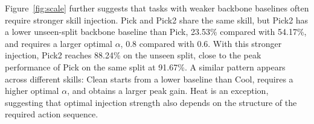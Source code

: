 \documentclass{llmxive}
\begin{document}
Figure~\ref{fig:scale} further suggests that tasks with weaker backbone baselines often require stronger skill injection. Pick and Pick2 share the same skill, but Pick2 has a lower unseen-split backbone baseline than Pick, 23.53\% compared with 54.17\%, and requires a larger optimal $\alpha$, 0.8 compared with 0.6. With this stronger injection, Pick2 reaches 88.24\% on the unseen split, close to the peak performance of Pick on the same split at 91.67\%. A similar pattern appears across different skills: Clean starts from a lower baseline than Cool, requires a higher optimal $\alpha$, and obtains a larger peak gain. Heat is an exception, suggesting that optimal injection strength also depends on the structure of the required action sequence.

\end{document}
